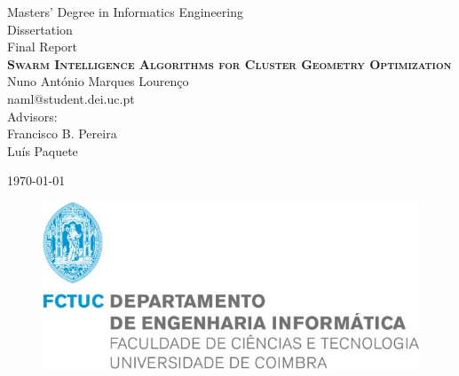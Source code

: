 \begin{titlepage}

\begin{flushleft}
\textsf{{\Large Masters' Degree in Informatics Engineering}} \\
\textsf{{\large Dissertation}} \\
\textsf{Final Report} \\[5cm]

\textsc{{\Huge \textbf{Swarm Intelligence Algorithms for Cluster Geometry Optimization}}} \\[2cm]

{\large Nuno António Marques Lourenço} \\
naml@student.dei.uc.pt \\[1cm]

Advisors: \\
{\large Francisco B. Pereira} \\
{\large Luís Paquete} \\

\hfill

\today

\vfill

\begin{figure}[b!]
\includegraphics[width=0.6\linewidth]{pictures/fctuc}
\end{figure}

\end{flushleft}

\end{titlepage}